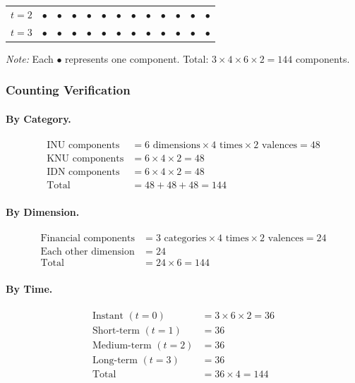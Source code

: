 \begin{table}[htbp]
\begin{tabular}{@{}l|cccccc|cccccc@{}}
\quad $t=2$ & $\bullet$ & $\bullet$ & $\bullet$ & $\bullet$ & $\bullet$ & $\bullet$ & $\bullet$ & $\bullet$ & $\bullet$ & $\bullet$ & $\bullet$ & $\bullet$ \\
\quad $t=3$ & $\bullet$ & $\bullet$ & $\bullet$ & $\bullet$ & $\bullet$ & $\bullet$ & $\bullet$ & $\bullet$ & $\bullet$ & $\bullet$ & $\bullet$ & $\bullet$ \\
\bottomrule
\end{tabular}
\begin{flushleft}
\small\textit{Note:} Each $\bullet$ represents one component. Total: $3 \times 4 \times 6 \times 2 = 144$ components.
\end{flushleft}
\end{table}

\subsubsection{Counting Verification}

\paragraph{By Category.}
\begin{align*}
\text{INU components} &= 6 \text{ dimensions} \times 4 \text{ times} \times 2 \text{ valences} = 48 \\
\text{KNU components} &= 6 \times 4 \times 2 = 48 \\
\text{IDN components} &= 6 \times 4 \times 2 = 48 \\
\text{Total} &= 48 + 48 + 48 = 144
\end{align*}

\paragraph{By Dimension.}
\begin{align*}
\text{Financial components} &= 3 \text{ categories} \times 4 \text{ times} \times 2 \text{ valences} = 24 \\
\text{Each other dimension} &= 24 \\
\text{Total} &= 24 \times 6 = 144
\end{align*}

\paragraph{By Time.}
\begin{align*}
\text{Instant } (t=0) &= 3 \times 6 \times 2 = 36 \\
\text{Short-term } (t=1) &= 36 \\
\text{Medium-term } (t=2) &= 36 \\
\text{Long-term } (t=3) &= 36 \\
\text{Total} &= 36 \times 4 = 144
\end{align*}

